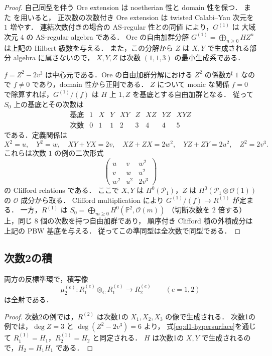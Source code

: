 \begin{proof}
自己同型を伴う Ore extension は noetherian 性と domain 性を保つ．
また \cite[Theorem~3.3 and Remark~2.2]{LWW2014} を用いると，
正次数の次数付き Ore extension は twisted Calabi--Yau 次元を $1$ 増やす．
連結次数付きの場合の AS-regular 性との同値
\cite[Proposition~1.6]{CKS2019}により，$G^{(1)}$ は
大域次元 $4$ の AS-regular algebra である．
Ore の自由加群分解 $G^{(1)}=\bigoplus_{n\geq0}HZ^n$ は上記の Hilbert 級数を与える．
また，この分解から $Z$ は $X,Y$ で生成される部分 algebra に属さないので，
$X,Y,Z$ は次数 $(1,1,3)$ の最小生成系である．

$f=Z^2-2v^3$ は中心元である．Ore の自由加群分解における $Z^2$ の係数が $1$ なので
$f\neq0$ であり，domain 性から正則である．
$Z$ について monic な関係 $f=0$ で除算すれば，$G^{(1)}/(f)$ は
$H$ 上 $1,Z$ を基底とする自由加群となる．
従って $S_0$ 上の基底とその次数は
\[
 \begin{array}{c|cccccccc}
 \text{基底}&1&X&Y&XY&Z&XZ&YZ&XYZ\\\hline
 \text{次数}&0&1&1&2&3&4&4&5
 \end{array}
\]
である．定義関係は
\[
 X^2=u,\quad Y^2=w,\quad XY+YX=2v,\quad
 XZ+ZX=2w^2,\quad YZ+ZY=2u^2,\quad Z^2=2v^3.
\]
これらは次数 $1$ の例の二次形式
\[
 \begin{pmatrix}
 u&v&w^2\\ v&w&u^2\\ w^2&u^2&2v^3
 \end{pmatrix}
\]
の Clifford relations である．
ここで $X,Y$ は $H^0(\mathcal P_1)$，$Z$ は
$H^0(\mathcal P_1\otimes\mathcal O(1))$ の $\mathcal O$ 成分から取る．
Clifford multiplication により $G^{(1)}/(f)\to R^{(1)}$ が定まる．
一方，$R^{(1)}$ は $S_0=\bigoplus_{m\geq0}H^0(\mathbb P^2,\mathcal O(m))$
（切断次数を $2$ 倍する）上，同じ $8$ 個の次数を持つ自由加群であり，
順序付き Clifford 積の外積成分は上記の PBW 基底を与える．
従ってこの準同型は全次数で同型である．
\end{proof}

\subsection{次数2の積}

\begin{lemma}
\label{lem:mu2-surjective}
両方の反標準環で，積写像
\[
 \mu^{(e)}_2:R^{(e)}_1\otimes_{\mathbb C}R^{(e)}_1\longrightarrow R^{(e)}_2
 \qquad(e=1,2)
\]
は全射である．
\end{lemma}
\begin{proof}
次数2の例では，$R^{(2)}$ は次数1の $X_1,X_2,X_3$ の像で生成される．
次数1の例では，$\deg Z=3$ と $\deg(Z^2-2v^3)=6$ より，
式\eqref{eq:d1-hypersurface}を通じて $R^{(1)}_1=H_1$，$R^{(1)}_2=H_2$ と同定される．
$H$ は次数1の $X,Y$ で生成されるので，$H_2=H_1H_1$ である．
\end{proof}

